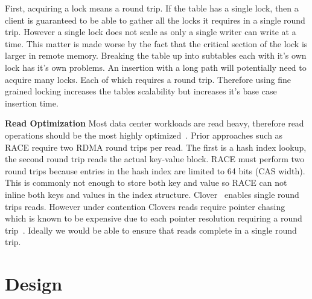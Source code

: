 First, acquiring a lock means a round trip. If the table has
a single lock, then a client is guaranteed to be able to
gather all the locks it requires in a single round trip.
However a single lock does not scale as only a single writer
can write at a time. This matter is made worse by the fact
that the critical section of the lock is larger in remote
memory. Breaking the table up into subtables each with it's
own lock has it's own problems. An insertion with a long
path will potentially need to acquire many locks. Each of
which requires a round trip. Therefore using fine grained
locking increases the tables scalability but increases it's
base case insertion time.

\textbf{Read Optimization} Most data center workloads are
read heavy, therefore read operations should be the most
highly optimized~\cite{datacenter-workloads}. Prior
approaches such as RACE require two RDMA round trips per
read. The first is a hash index lookup, the second round
trip reads the actual key-value block. RACE must perform two
round trips because entries in the hash index are limited to
64 bits (CAS width). This is commonly not enough to store
both key and value so RACE can not inline both keys and
values in the index structure. Clover~\cite{clover} enables
single round trips reads. However under contention Clovers
reads require pointer chasing which is known to be expensive
due to each pointer resolution requiring a round
trip~\cite{clio,clover,pointer-chaising}. Ideally we would
be able to ensure that reads complete in a single round
trip.


\section{Design}
\label{sec:design}

